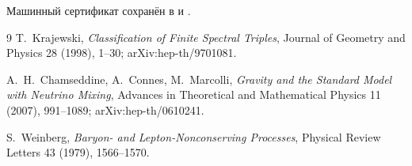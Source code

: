 Машинный сертификат сохранён в
 и
.

\begin{thebibliography}{9}
T.~Krajewski,
\emph{Classification of Finite Spectral Triples},
Journal of Geometry and Physics 28 (1998), 1--30;
arXiv:hep-th/9701081.

A.~H.~Chamseddine, A.~Connes, M.~Marcolli,
\emph{Gravity and the Standard Model with Neutrino Mixing},
Advances in Theoretical and Mathematical Physics 11 (2007), 991--1089;
arXiv:hep-th/0610241.

S.~Weinberg,
\emph{Baryon- and Lepton-Nonconserving Processes},
Physical Review Letters 43 (1979), 1566--1570.
\end{thebibliography}
